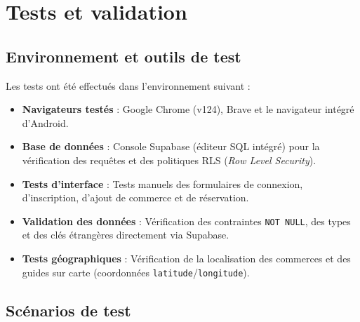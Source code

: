 \documentclass[12pt,a4paper]{report}
\begin{document}
\chapter{Tests et validation}

\section{Environnement et outils de test}

Les tests ont été effectués dans l'environnement suivant :

\begin{itemize}
  \item \textbf{Navigateurs testés} : Google Chrome (v124), Brave et le navigateur intégré d'Android.
  \item \textbf{Base de données} : Console Supabase (éditeur SQL intégré) pour la vérification des requêtes et des politiques RLS (\textit{Row Level Security}).
  \item \textbf{Tests d'interface} : Tests manuels des formulaires de connexion, d'inscription, d'ajout de commerce et de réservation.
  \item \textbf{Validation des données} : Vérification des contraintes \texttt{NOT NULL}, des types et des clés étrangères directement via Supabase.
  \item \textbf{Tests géographiques} : Vérification de la localisation des commerces et des guides sur carte (coordonnées \texttt{latitude}/\texttt{longitude}).
\end{itemize}

\section{Scénarios de test}
\end{document}

